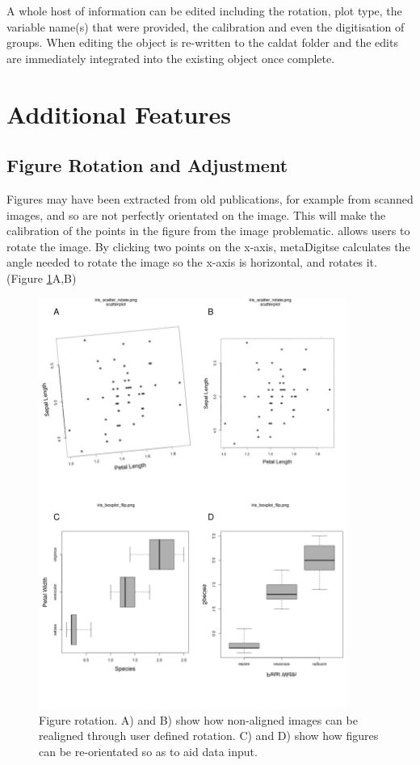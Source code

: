 \documentclass[article]{jss}
\newcommand{\fct}[1]{\code{#1()}}
\begin{document}
A whole host of information can be edited including the rotation, plot type, the variable name(s) that were provided, the calibration and even the digitisation of groups. When editing the  object is re-written to the caldat folder and the edits are immediately integrated into the existing object once complete. 


\section{Additional Features}

\subsection{Figure Rotation and Adjustment}
Figures may have been extracted from old publications, for example from scanned images, and so are not perfectly orientated on the image. This will make the calibration of the points in the figure from the image problematic. \fct{metaDigitise} allows users to rotate the image. By clicking two points on the x-axis, metaDigitse calculates the angle needed to rotate the image so the x-axis is horizontal, and rotates it. (Figure \ref{fig:rotate}A,B)

\begin{figure}[!b] 
 \includegraphics[width=0.9\textwidth]{fig_rotate.pdf} 
 \caption{Figure rotation. A) and B) show how non-aligned images can be realigned through user defined rotation. C) and D) show how figures can be re-orientated so as to aid data input.}
\label{fig:rotate}
\end{figure}
\end{document}
